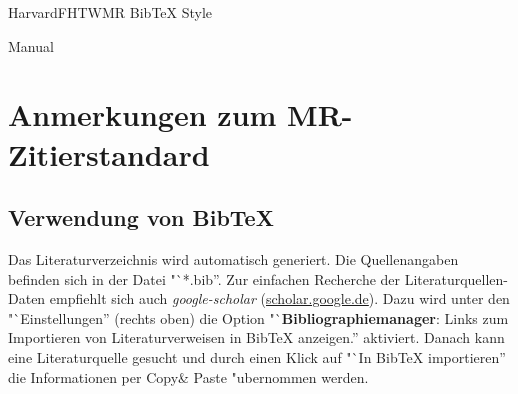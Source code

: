 \documentclass[a4paper,bibtotoc,oneside]{scrbook}
\begin{document}
\newcommand{\citepic}[1]{(Source: \protect\cite{#1})}%
\newcommand{\citefig}[2]{(Source: \protect\cite{#1}, p. #2)}%
\newcommand{\citefigm}[2]{(Source: taken with modification from \protect\cite{#1}, p. #2)}%
\newcommand{\citep}{\citeasnoun}%
\newcommand{\acessedthrough}{Available at:}%
\newcommand{\acessedthroughp}{Available through:}%
\newcommand{\acessedat}{Accessed}%
\newcommand{\singlepage}{p.}%
\newcommand{\multiplepages}{pp.}%
\newcommand{\chapternr}{Ch.}%
\renewcommand{\harvardand}{\&}%
\newcommand{\abstractonly}{Abstract only}%
\newcommand{\edition}{~edition}%


\thispagestyle{empty}
\begin{center}
\begin{Huge}
HarvardFHTWMR BibTeX Style
\end{Huge}

\vspace{20pt}
\begin{LARGE}
Manual
\end{LARGE}
\end{center}


\newpage

\tableofcontents\thispagestyle{empty}
\newpage

\chapter{Anmerkungen zum MR-Zitierstandard}

\section{Verwendung von BibTeX}

Das Literaturverzeichnis wird automatisch generiert. Die Quellenangaben befinden sich in der Datei "`*.bib''. Zur einfachen Recherche der Literaturquellen-Daten empfiehlt sich auch \textit{google-scholar} (\url{scholar.google.de}). Dazu wird unter den "`Einstellungen'' (rechts oben) die Option  "`\textbf{Bibliographiemanager}: Links zum Importieren von Literaturverweisen in BibTeX anzeigen.'' aktiviert. Danach kann eine Literaturquelle gesucht und durch einen Klick auf "`In BibTeX importieren'' die Informationen per Copy\& Paste "ubernommen werden.\\
\end{document}
